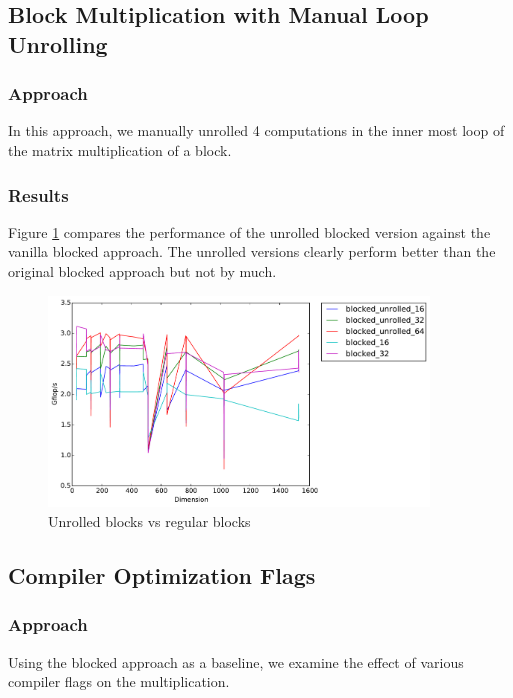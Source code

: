 \documentclass[11pt]{article}
\begin{document}
\subsection{Block Multiplication with Manual Loop Unrolling}
\subsubsection{Approach}
In this approach, we manually unrolled 4 computations in the inner most loop of the matrix multiplication of a block. 
\subsubsection{Results}
Figure \ref{unrolled_vs_regular} compares the performance of the unrolled blocked version against the vanilla blocked approach. The unrolled versions clearly perform better than the original blocked approach but not by much. 
\begin{figure}[H]
    \includegraphics[width=0.9\textwidth]{timing_unrolled_vs_nonunrolled.pdf}
    \caption{Unrolled blocks vs regular blocks}
    \label{unrolled_vs_regular}
\end{figure} 

\subsection{Compiler Optimization Flags}
\subsubsection{Approach}
Using the blocked approach as a baseline, we examine the effect of various compiler flags on the multiplication.
\end{document}
